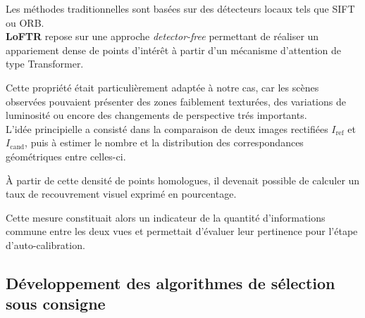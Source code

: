 \documentclass[12pt,a4paper,oneside]{report}
\newcommand{\textsb}[1]{{\fontseries{sb}\selectfont #1}}
\begin{document}
\hspace*{0.5cm}Les méthodes traditionnelles sont basées sur des détecteurs locaux tels que \textsb{SIFT} ou \textsb{ORB}.\\
\hspace*{0.5cm}\textbf{LoFTR} repose sur une approche \textsb{\textit{detector-free}} permettant de réaliser un appariement dense de points d'intérêt à partir d'un mécanisme d'attention de type Transformer.\vspace{0.05cm}

\hspace*{1cm}Cette propriété était particulièrement adaptée à notre cas, car les scènes observées pouvaient présenter des zones faiblement texturées, des variations de luminosité ou encore des changements de perspective trés importants.\\

\hspace*{1cm}L'idée principielle a consisté dans la comparaison de deux images rectifiées \textsb{$I_{\text{ref}}$} et \textsb{$I_{\text{cand}}$}, puis à estimer le nombre et la distribution des correspondances géométriques entre celles-ci.\vspace{0.1cm}

\hspace*{1cm}À partir de cette densité de points homologues, il devenait possible de calculer un \textsb{taux de recouvrement visuel} exprimé en pourcentage. \vspace{0.05cm}

\hspace*{0.5cm}Cette mesure constituait alors un indicateur de la quantité d'informations commune entre les deux vues et permettait d'évaluer leur pertinence pour l'étape d'auto-calibration.

\newpage

\subsection{Développement des algorithmes de sélection sous consigne}
\end{document}
